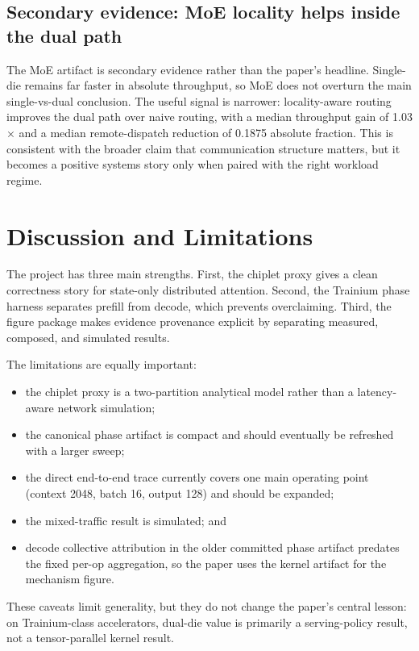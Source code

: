 \documentclass[10pt]{article}
\begin{document}
\subsection{Secondary evidence: MoE locality helps inside the dual path}
The MoE artifact is secondary evidence rather than the paper's headline. Single-die remains far faster in absolute throughput, so MoE does not overturn the main single-vs-dual conclusion. The useful signal is narrower: locality-aware routing improves the dual path over naive routing, with a median throughput gain of \num{1.03}$\times$ and a median remote-dispatch reduction of 0.1875 absolute fraction. This is consistent with the broader claim that communication structure matters, but it becomes a positive systems story only when paired with the right workload regime.

\section{Discussion and Limitations}
The project has three main strengths. First, the chiplet proxy gives a clean correctness story for state-only distributed attention. Second, the Trainium phase harness separates prefill from decode, which prevents overclaiming. Third, the figure package makes evidence provenance explicit by separating measured, composed, and simulated results.

The limitations are equally important:
\begin{itemize}[leftmargin=1.3em]
  \item the chiplet proxy is a two-partition analytical model rather than a latency-aware network simulation;
  \item the canonical phase artifact is compact and should eventually be refreshed with a larger sweep;
  \item the direct end-to-end trace currently covers one main operating point (context 2048, batch 16, output 128) and should be expanded;
  \item the mixed-traffic result is simulated; and
  \item decode collective attribution in the older committed phase artifact predates the fixed per-op aggregation, so the paper uses the kernel artifact for the mechanism figure.
\end{itemize}
These caveats limit generality, but they do not change the paper's central lesson: on Trainium-class accelerators, dual-die value is primarily a serving-policy result, not a tensor-parallel kernel result.
\end{document}
